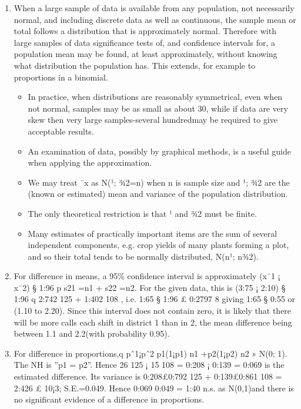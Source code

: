 \documentclass[a4paper,12pt]{article}
\begin{document}
\begin{enumerate}
    \item When a large sample of data is available from any population, not necessarily normal, and
including discrete data as well as continuous, the sample mean or total follows a distribution that
is approximately normal. Therefore with large samples of data significance tests of, and confidence
intervals for, a population mean may be found, at least approximately, without knowing what
distribution the population has. This extends, for example to proportions in a binomial.
\begin{itemize}
    \item In practice, when distributions are reasonably symmetrical, even when not normal, samples
may be as small as about 30, while if data are very skew then very large samples-several hundredmay
be required to give acceptable results. 
\item An examination of data, possibly by graphical methods,
is a useful guide when applying the approximation.
\item We may treat ¯x as N(¹; ¾2=n) when n is sample size and ¹; ¾2 are the (known or estimated)
mean and variance of the population distribution. 
\item The only theoretical restriction is that ¹ and
¾2 must be finite.
\item Many estimates of practically important items are the sum of several independent components,
e.g. crop yields of many plants forming a plot, and so their total tends to be normally distributed,
N(n¹; n¾2).
\end{itemize}

\item For difference in means, a 95\% confidence interval is approximately
(x¯1 ¡ x¯2) § 1:96
p
s21
=n1 + s22
=n2.
For the given data, this is (3:75 ¡ 2:10) § 1:96
q
2:742
125 + 1:402
108 , i.e. 1:65 § 1:96 £ 0:2797
8
giving 1:65 § 0:55 or (1.10 to 2.20).
Since this interval does not contain zero, it is likely that there will be more calls each shift in
district 1 than in 2, the mean difference being between 1.1 and 2.2(with probability 0.95).
\item For difference in proportions,q pˆ1¡pˆ2
p1(1¡p1)
n1
+p2(1¡p2)
n2
» N(0; 1).
The NH is ”p1 = p2”.
Hence 26
125 ¡ 15
108 = 0:208 ¡ 0:139 = 0:069 is the estimated difference.
Its variance is 0:208£0:792
125 + 0:139£0:861
108 = 2:426 £ 10¡3; S.E.=0.049.
Hence 0:069
0:049 = 1:40 n.s. as N(0,1)and there is no significant evidence of a difference in proportions.
\end{enumerate}
\end{document}
